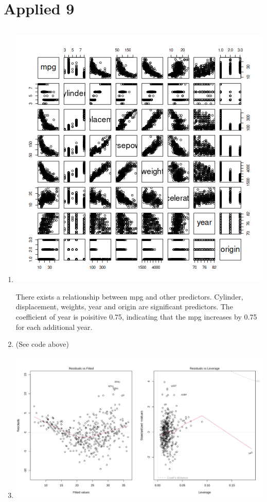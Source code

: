 \documentclass{article}
\begin{document}
\section*{Applied 9}
\inputminted{r}{q9.R}

\begin{enumerate}[label=(\alph*)]
  \item
    \includegraphics[scale=0.4]{q9.png}

    There exists a relationship between mpg and other predictors. Cylinder, displacement, weights, year and origin are significant predictors. The coefficient of year is poisitive 0.75, indicating that the mpg increases by 0.75 for each additional year.

  \item (See code above)
  \item
    \includegraphics[scale=0.3]{q9_2.jpg}


\end{enumerate}
\end{document}
